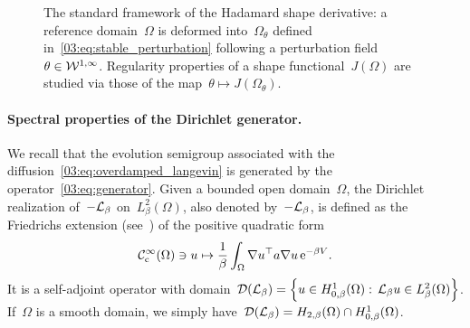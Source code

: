 \begin{figure}
            \caption[]{\label{03:fig:shape_perturbation} The standard framework of the Hadamard shape derivative: a reference domain~$\Omega$ is deformed into~$\Omega_\theta$ defined in~\eqref{03:eq:stable_perturbation} following a perturbation field~$\theta\in{\mathcal{W}}^{1,\infty}$. Regularity properties of a shape functional~$J(\Omega)$ are studied via those of the map~$\theta\mapsto J(\Omega_\theta)$.}
        \end{figure}
        
        \paragraph{Spectral properties of the Dirichlet generator.}
        We recall that the evolution semigroup associated with the diffusion~\eqref{03:eq:overdamped_langevin} is generated by the operator~\eqref{03:eq:generator}.
        Given a bounded open domain~$\Omega$, the Dirichlet realization of~$-\mathcal{L}_\beta$ on~$L^2_\beta(\Omega)$, also denoted by~$-\mathcal{L}_\beta$, is defined as the Friedrichs extension (see~\cite{T14}) of the positive quadratic form
        \begin{equation}
            \mathcal C_{\mathrm{c}}^\infty(\Omega)\ni u\mapsto \frac1\beta\int_{\Omega}\nabla u^\top a \nabla u\,\mathrm{e}^{-\beta V}.
        \end{equation}
        It is a self-adjoint operator with domain~$\mathcal D(\mathcal{L}_\beta) = \left\{u\in H_{0,\beta}^1(\Omega):\, \mathcal{L}_\beta u\in L^2_\beta(\Omega)\right\}$.
       If~$\Omega$ is a smooth domain, we simply have~$\mathcal D(\mathcal{L}_\beta)=H_{2,\beta}(\Omega)\cap H_{0,\beta}^1(\Omega)$.

